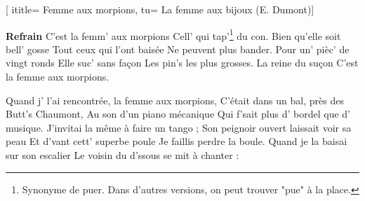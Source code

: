  [
ititle= {Femme aux morpions},
tu= {La femme aux bijoux (E. Dumont)}]

\beginchorus
\textbf {Refrain}
C'est la femm' aux morpions
Cell' qui tap'\footnote {Synonyme de puer. Dans d'autres versions, on peut trouver "pue" à la place.} du con.
Bien qu'elle soit bell' gosse
Tout ceux qui l'ont baisée
Ne peuvent plus bander.
Pour un' pièc' de vingt ronds
Elle suc' sans façon
Les pin's les plus grosses.
La reine du suçon
C'est la femme aux morpions.
\endchorus

\beginverse
Quand j' l'ai rencontrée, la femme aux morpions,
C'était dans un bal, près des Butt's Chaumont,
Au son d'un piano mécanique
Qui f'sait plus d' bordel que d' musique.
J'invitai la même à faire un tango ;
Son peignoir ouvert laissait voir sa peau
Et d'vant cett' superbe poule
Je faillis perdre la boule.
Quand je la baisai sur son escalier
Le voisin du d'ssous se mit à chanter :
\endverse

\endsong